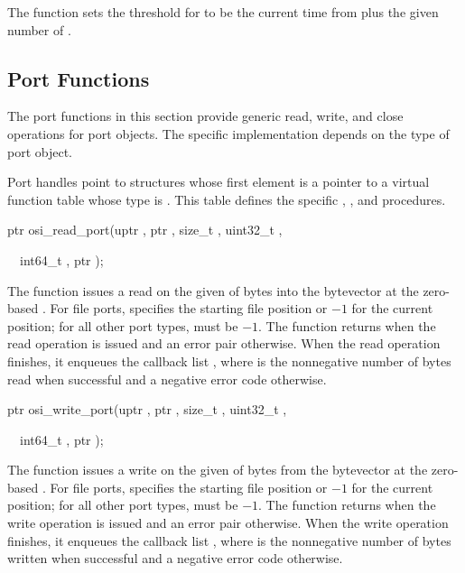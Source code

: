 The  function sets the threshold for
 to be the current time from
 plus the given number of .

\subsection {Port Functions}

The port functions in this section provide generic read, write, and
close operations for port objects. The specific implementation depends
on the type of port object.

Port handles point to structures whose first element is a pointer to a
virtual function table whose type is . This
table defines the specific , , and 
procedures.

\begin{function}
\codebegin
ptr osi\_read\_port(uptr , ptr , size\_t , uint32\_t ,\strut
       \     \      int64\_t , ptr );\strut
\codeend
\end{function}

The  function issues a read on the given
 of  bytes into the bytevector  at the
zero-based . For file ports,  specifies
the starting file position or $-1$ for the current position; for all
other port types,  must be $-1$.  The function returns
 when the read operation is issued and an error pair
otherwise. When the read operation finishes, it enqueues the callback
list , where  is the
nonnegative number of bytes read when successful and a negative error
code otherwise.

\begin{function}
\codebegin
ptr osi\_write\_port(uptr , ptr , size\_t , uint32\_t ,\strut
       \      \      int64\_t , ptr );\strut
\codeend\end{function}

The  function issues a write on the given
 of  bytes from the bytevector  at the
zero-based . For file ports,  specifies
the starting file position or $-1$ for the current position; for all
other port types,  must be $-1$.  The function returns
 when the write operation is issued and an error pair
otherwise. When the write operation finishes, it enqueues the callback
list , where  is the
nonnegative number of bytes written when successful and a negative
error code otherwise.


